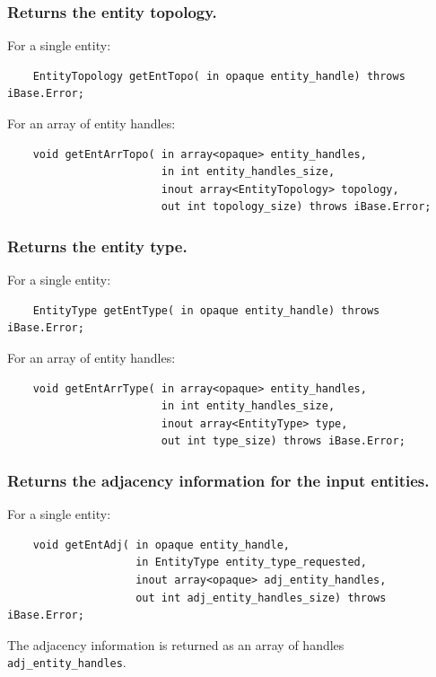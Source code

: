 \documentclass{article}
\begin{document}
\subsubsection{Returns the entity topology.}

For a single entity:

\begin{verbatim}
    EntityTopology getEntTopo( in opaque entity_handle) throws iBase.Error;
\end{verbatim}

For an array of entity handles:

\begin{verbatim}
    void getEntArrTopo( in array<opaque> entity_handles, 
                        in int entity_handles_size, 
                        inout array<EntityTopology> topology, 
                        out int topology_size) throws iBase.Error;
\end{verbatim}

\subsubsection{Returns the entity type.}

For a single entity:

\begin{verbatim}
    EntityType getEntType( in opaque entity_handle) throws iBase.Error;
\end{verbatim}

For an array of entity handles:

\begin{verbatim}
    void getEntArrType( in array<opaque> entity_handles, 
                        in int entity_handles_size, 
                        inout array<EntityType> type, 
                        out int type_size) throws iBase.Error;
\end{verbatim}

\subsubsection{Returns the adjacency information for the input entities.}


For a single entity: 
\begin{verbatim}
    void getEntAdj( in opaque entity_handle,   
                    in EntityType entity_type_requested,  
                    inout array<opaque> adj_entity_handles,  
                    out int adj_entity_handles_size) throws iBase.Error;
\end{verbatim}
The adjacency information is returned as 
an array of handles {\tt adj\_entity\_handles}.\\
\end{document}
